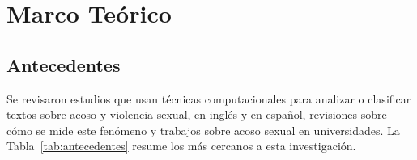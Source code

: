 \chapter{Marco Teórico}

\section{Antecedentes}
Se revisaron estudios que usan técnicas computacionales para analizar o clasificar textos sobre acoso y violencia sexual, en inglés y en español, revisiones sobre cómo se mide este fenómeno y trabajos sobre acoso sexual en universidades. La Tabla~\ref{tab:antecedentes} resume los más cercanos a esta investigación.


